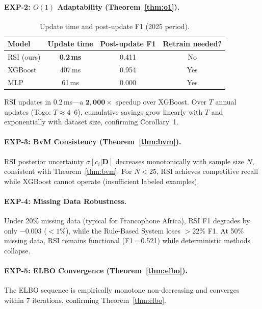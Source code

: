 \documentclass[letterpaper]{article}
\begin{document}
\paragraph{EXP-2: $O(1)$ Adaptability (Theorem~\ref{thm:o1}).}

\begin{table}[H]
\centering
\caption{Update time and post-update F1 (2025 period).}
\label{tab:update}
\renewcommand{\arraystretch}{1.2}
\begin{tabular}{lccc}
\toprule
\textbf{Model} & \textbf{Update time} & \textbf{Post-update F1}
  & \textbf{Retrain needed?} \\
\midrule
RSI (ours) & \textbf{0.2\,ms} & 0.411 & No \\
XGBoost & 407\,ms & 0.954 & Yes \\
MLP & 61\,ms & 0.000 & Yes \\
\bottomrule
\end{tabular}
\end{table}

RSI updates in 0.2\,ms---a $\mathbf{2{,}000\times}$ speedup over
XGBoost. Over $T$ annual updates (Togo: $T \approx 4$--$6$),
cumulative savings grow linearly with $T$ and exponentially with
dataset size, confirming Corollary~1.

\paragraph{EXP-3: BvM Consistency (Theorem~\ref{thm:bvm}).}
RSI posterior uncertainty $\sigma[c_i | \mathbf{D}]$ decreases
monotonically with sample size $N$, consistent with
Theorem~\ref{thm:bvm}. For $N < 25$, RSI achieves competitive recall
while XGBoost cannot operate (insufficient labeled examples).

\paragraph{EXP-4: Missing Data Robustness.}
Under 20\% missing data (typical for Francophone Africa), RSI F1
degrades by only $-0.003$ ($< 1\%$), while the Rule-Based System
loses $> 22\%$ F1. At 50\% missing data, RSI remains functional
(F1\,=\,0.521) while deterministic methods collapse.

\paragraph{EXP-5: ELBO Convergence (Theorem~\ref{thm:elbo}).}
The ELBO sequence is empirically monotone non-decreasing and converges
within 7 iterations, confirming Theorem~\ref{thm:elbo}.
\end{document}

